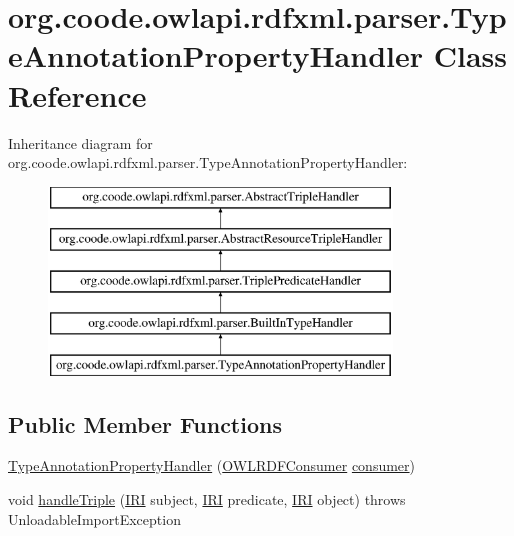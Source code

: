 \hypertarget{classorg_1_1coode_1_1owlapi_1_1rdfxml_1_1parser_1_1_type_annotation_property_handler}{\section{org.\-coode.\-owlapi.\-rdfxml.\-parser.\-Type\-Annotation\-Property\-Handler Class Reference}
\label{classorg_1_1coode_1_1owlapi_1_1rdfxml_1_1parser_1_1_type_annotation_property_handler}
}
Inheritance diagram for org.\-coode.\-owlapi.\-rdfxml.\-parser.\-Type\-Annotation\-Property\-Handler\-:\begin{figure}[H]
\begin{center}
\leavevmode
\includegraphics[height=5.000000cm]{classorg_1_1coode_1_1owlapi_1_1rdfxml_1_1parser_1_1_type_annotation_property_handler}
\end{center}
\end{figure}
\subsection*{Public Member Functions}
\begin{DoxyCompactItemize}
\item 
\hyperlink{classorg_1_1coode_1_1owlapi_1_1rdfxml_1_1parser_1_1_type_annotation_property_handler_aaf2dabae20488e881f157d8a4ab74ef8}{Type\-Annotation\-Property\-Handler} (\hyperlink{classorg_1_1coode_1_1owlapi_1_1rdfxml_1_1parser_1_1_o_w_l_r_d_f_consumer}{O\-W\-L\-R\-D\-F\-Consumer} \hyperlink{classorg_1_1coode_1_1owlapi_1_1rdfxml_1_1parser_1_1_abstract_triple_handler_a4ccf4d898ff01eb1cadfa04b23d54e9c}{consumer})
\item 
void \hyperlink{classorg_1_1coode_1_1owlapi_1_1rdfxml_1_1parser_1_1_type_annotation_property_handler_a59d70408995432067ab65f7ec3379b5e}{handle\-Triple} (\hyperlink{classorg_1_1semanticweb_1_1owlapi_1_1model_1_1_i_r_i}{I\-R\-I} subject, \hyperlink{classorg_1_1semanticweb_1_1owlapi_1_1model_1_1_i_r_i}{I\-R\-I} predicate, \hyperlink{classorg_1_1semanticweb_1_1owlapi_1_1model_1_1_i_r_i}{I\-R\-I} object)  throws Unloadable\-Import\-Exception 
\end{DoxyCompactItemize}
